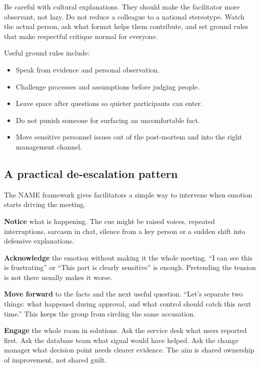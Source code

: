 Be careful with cultural explanations. They should make the facilitator more observant, not lazy. Do not reduce a colleague to a national stereotype. Watch the actual person, ask what format helps them contribute, and set ground rules that make respectful critique normal for everyone.


Useful ground rules include:


\begin{itemize}[leftmargin=*]
\item Speak from evidence and personal observation.
\item Challenge processes and assumptions before judging people.
\item Leave space after questions so quieter participants can enter.
\item Do not punish someone for surfacing an uncomfortable fact.
\item Move sensitive personnel issues out of the post-mortem and into the right management channel.
\end{itemize}


\subsection{A practical de-escalation pattern}


The NAME framework gives facilitators a simple way to intervene when emotion starts driving the meeting.


\textbf{Notice} what is happening. The cue might be raised voices, repeated interruptions, sarcasm in chat, silence from a key person or a sudden shift into defensive explanations.


\textbf{Acknowledge} the emotion without making it the whole meeting. ``I can see this is frustrating'' or ``This part is clearly sensitive'' is enough. Pretending the tension is not there usually makes it worse.


\textbf{Move forward} to the facts and the next useful question. ``Let's separate two things: what happened during approval, and what control should catch this next time.'' This keeps the group from circling the same accusation.


\textbf{Engage} the whole room in solutions. Ask the service desk what users reported first. Ask the database team what signal would have helped. Ask the change manager what decision point needs clearer evidence. The aim is shared ownership of improvement, not shared guilt.



